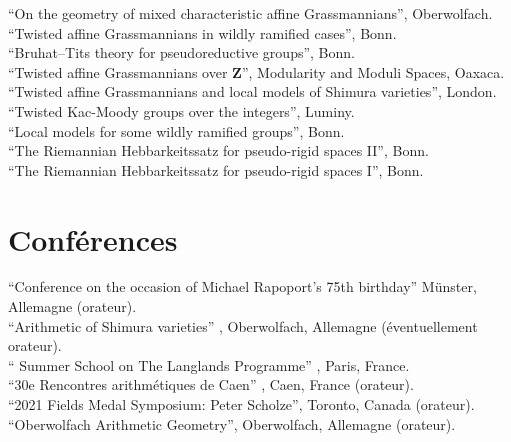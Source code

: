 \documentclass[12pt]{article} %
\begin{document}
 ``On the geometry of mixed characteristic affine Grassmannians'', Oberwolfach.
\\

``Twisted affine Grassmannians in wildly ramified cases'', Bonn.
\\

``Bruhat--Tits theory for pseudoreductive groups'', Bonn.
\\

 ``Twisted affine Grassmannians over $\mathbf{Z}$'', Modularity and Moduli Spaces, Oaxaca. 
\\

 ``Twisted affine Grassmannians and local models of Shimura varieties'', London.
\\

 ``Twisted Kac-Moody groups over the integers'', Luminy. 
\\

 ``Local models for some wildly ramified groups'', Bonn.  
\\

 ``The Riemannian Hebbarkeitssatz for pseudo-rigid spaces II'', Bonn.  
\\

 ``The Riemannian Hebbarkeitssatz for pseudo-rigid spaces I'', Bonn.  	 

\section*{Conférences}

``Conference on the occasion of Michael Rapoport's 75th birthday''  Münster, Allemagne (orateur).\\

``Arithmetic of Shimura varieties'' , Oberwolfach, Allemagne (éventuellement orateur). \\

`` Summer School on The Langlands Programme'' , Paris, France. \\

``30e Rencontres arithmétiques de Caen'' , Caen, France (orateur). \\

``2021 Fields Medal Symposium: Peter Scholze'',  Toronto, Canada (orateur). \\

``Oberwolfach Arithmetic Geometry'', Oberwolfach, Allemagne (orateur).\\
\end{document}
